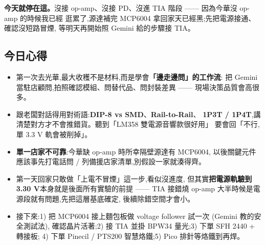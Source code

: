 \textbf{今天就停在這。}沒接 op-amp、沒接 PD、沒進 TIA 階段 —— 因為今華沒 op-amp 的時候我已經
逛累了,源達補完 MCP6004 拿回家天已經黑;先把電源接通、確認沒短路冒煙,
等明天再開始照 Gemini 給的步驟接 TIA。

\subsection*{今日心得}

\begin{itemize}[leftmargin=2em,itemsep=0pt]
  \item 第一次去光華,最大收穫不是材料,而是學會\textbf{「邊走邊問」的工作流}:
        把 Gemini 當駐店顧問,拍照確認模組、問替代品、問封裝差異 ——
        現場決策品質會高很多。
  \item 跟老闆對話得用對術語:\textbf{DIP-8 vs SMD}、\textbf{Rail-to-Rail}、
        \textbf{1P3T / 1P4T},講清楚對方才不會推錯貨。聽到「LM358 雙電源音響款很好用」
        要會回「不行,單 3.3 V 軌會被削掉」。
  \item \textbf{單一店家不可靠}:今華缺 op-amp 時所幸隔壁源達有 MCP6004,
        以後關鍵元件應該事先打電話問 / 列備援店家清單,別假設一家就湊得齊。
  \item 第一天回家只敢做「上電不冒煙」這一步,看似沒進度,
        但其實\textbf{把電源軌驗到 3.30 V}本身就是後面所有實驗的前提 ——
        TIA 接錯燒 op-amp 大半時候是電源段就有問題,先把這層基底確定,
        後續除錯空間才會小。
  \item 接下來:1) 把 MCP6004 接上麵包板做 voltage follower 試一次 (Gemini 教的安全測試法),
        確認晶片活著;2) 接 TIA 並掛 BPW34 量光;3) 下單 SFH 2440 + 轉接板;
        4) 下單 Pinecil / PTS200 智慧烙鐵;5) Pico 排針等烙鐵到再焊。
\end{itemize}
